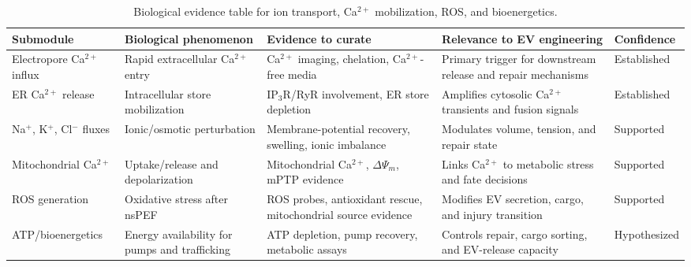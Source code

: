 \begin{table}[t]
\footnotesize\sf
\centering
\caption{Biological evidence table for ion transport, Ca$^{2+}$ mobilization, ROS, and bioenergetics.\label{T_A5_bio_ca_ros}}
\begin{tabular}{p{2.7cm} p{3.4cm} p{4.2cm} p{3.0cm} p{2.0cm}}
\toprule
\textbf{Submodule} & \textbf{Biological phenomenon} & \textbf{Evidence to curate} & \textbf{Relevance to EV engineering} & \textbf{Confidence} \\
\midrule
Electropore Ca$^{2+}$ influx & Rapid extracellular Ca$^{2+}$ entry & Ca$^{2+}$ imaging, chelation, Ca$^{2+}$-free media & Primary trigger for downstream release and repair mechanisms & Established \cite{bagalkot2018membrane,bhattacharya2022calcium,morotomi2014extracellular,yun2024modulating,cantu2021caveolin} \\
ER Ca$^{2+}$ release & Intracellular store mobilization & IP$_3$R/RyR involvement, ER store depletion & Amplifies cytosolic Ca$^{2+}$ transients and fusion signals & Established \cite{semenov2013recruitment,tolstykh2013activation,tolstykh2014pip2,wang2009cardiac,azarov2019excitation} \\
Na$^+$, K$^+$, Cl$^-$ fluxes & Ionic/osmotic perturbation & Membrane-potential recovery, swelling, ionic imbalance & Modulates volume, tension, and repair state & Supported \cite{smith2011transmembrane,burke2017nanosecond,muratori2017activation,silkuniene2023silencing,yang2021regulation} \\
Mitochondrial Ca$^{2+}$ & Uptake/release and depolarization & Mitochondrial Ca$^{2+}$, $\Delta\Psi_m$, mPTP evidence & Links Ca$^{2+}$ to metabolic stress and fate decisions & Supported \cite{beebe2012transient,napotnik2012mitochondrial,murphy2016mitochondrial} \\
ROS generation & Oxidative stress after nsPEF & ROS probes, antioxidant rescue, mitochondrial source evidence & Modifies EV secretion, cargo, and injury transition & Supported \cite{pakhomova2012oxidative,nuccitelli2013reactive,zhang2022crosstalk,lee2019caveolin,wiczew2021molecular} \\
ATP/bioenergetics & Energy availability for pumps and trafficking & ATP depletion, pump recovery, metabolic assays & Controls repair, cargo sorting, and EV-release capacity & Hypothesized \cite{frandsen2012calcium,radzeviciute2024calcium,gibot2020calcium} \\
\bottomrule
\end{tabular}
\end{table}


